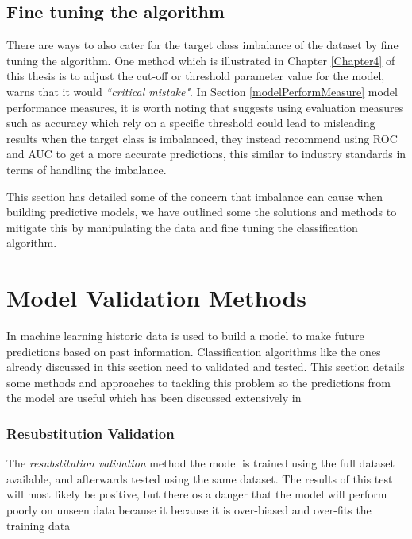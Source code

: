 \subsection{Fine tuning the algorithm}
There are ways to also cater for the target class imbalance of the dataset by fine tuning the algorithm. One method which is illustrated in Chapter \ref{Chapter4} of this thesis is to adjust the cut-off or threshold parameter value for the model, \cite{provost_machine_2000} warns that it would \textit{``critical mistake"}. In Section \ref{modelPerformMeasure} model performance measures, it is  worth noting that \cite{chawla_editorial:_2004} suggests using evaluation measures such as accuracy which rely on a specific threshold could lead to misleading results when the target class is imbalanced, they instead recommend using ROC and AUC to get a more accurate predictions, this similar to industry standards in terms of handling the imbalance.

This section has detailed some of the concern that imbalance can cause when building predictive models, we have outlined some the solutions and methods to mitigate this by manipulating the data and fine tuning the classification algorithm.

\section{Model Validation Methods}
In machine learning historic data is used to build a model to make future predictions based on past information. Classification algorithms like the ones already discussed in this section need to validated and tested. This section details some methods and approaches to tackling this problem so the predictions from the model are useful which has been discussed extensively in \citep{refaeilzadeh_cross-validation_2009}

\subsubsection{Resubstitution Validation}
The \textit{resubstitution validation} method the model is trained using the full dataset available, and afterwards tested using the same dataset. The results of this test will most likely be positive, but there os a danger that the model will perform poorly on unseen data because it because it is over-biased and over-fits the training data

